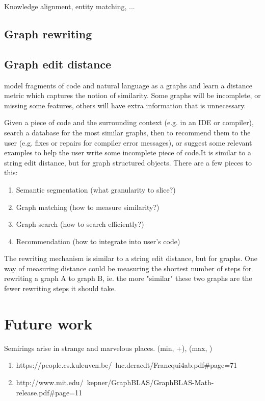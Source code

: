 \documentclass[11pt]{article}
\begin{document}
    Knowledge alignment, entity matching, ...

    \subsection{Graph rewriting}

    \subsection{Graph edit distance}

    model fragments of code and natural language as a graphs and learn a distance metric which captures the notion of similarity. Some graphs will be incomplete, or missing some features, others will have extra information that is unnecessary.

    Given a piece of code and the surrounding context (e.g. in an IDE or compiler), search a database for the most similar graphs, then to recommend them to the user (e.g. fixes or repairs for compiler error messages), or suggest some relevant examples to help the user write some incomplete piece of code.It is similar to a string edit distance, but for graph structured objects. There are a few pieces to this:

    \begin{enumerate}
    \item Semantic segmentation (what granularity to slice?)
    \item Graph matching (how to measure similarity?)
    \item Graph search (how to search efficiently?)
    \item Recommendation (how to integrate into user's code)
    \end{enumerate}

    The rewriting mechanism is similar to a string edit distance, but for graphs. One way of measuring distance could be measuring the shortest number of steps for rewriting a graph A to graph B, ie. the more "similar" these two graphs are the fewer rewriting steps it should take.

    \section{Future work}

    Semirings arise in strange and marvelous places. (min, +), (max, \times)

    \begin{enumerate}
    \item https://people.cs.kuleuven.be/~luc.deraedt/Francqui4ab.pdf#page=71
    \item http://www.mit.edu/~kepner/GraphBLAS/GraphBLAS-Math-release.pdf#page=11
    \end{enumerate}

    
    
\end{document}

